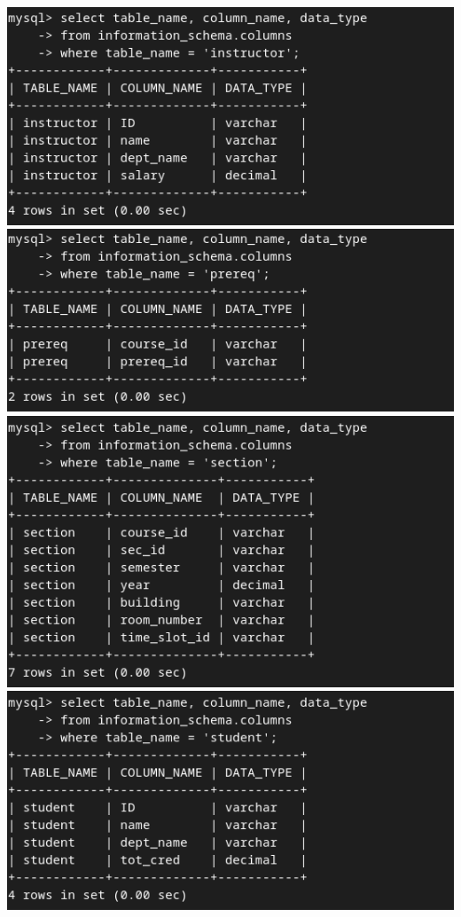 \documentclass{article}
\begin{document}
\begin{center}
    \includegraphics[scale=0.6]{6-5.png}
    \includegraphics[scale=0.6]{6-6.png}
    \includegraphics[scale=0.6]{6-7.png}
    \includegraphics[scale=0.6]{6-8.png}

\end{center}
\end{document}
